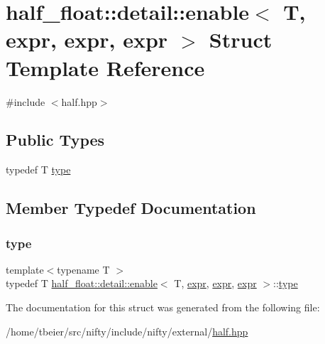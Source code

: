 \hypertarget{structhalf__float_1_1detail_1_1enable_3_01T_00_01expr_00_01expr_00_01expr_01_4}{}\section{half\+\_\+float\+:\+:detail\+:\+:enable$<$ T, expr, expr, expr $>$ Struct Template Reference}
\label{structhalf__float_1_1detail_1_1enable_3_01T_00_01expr_00_01expr_00_01expr_01_4}


{\ttfamily \#include $<$half.\+hpp$>$}

\subsection*{Public Types}
\begin{DoxyCompactItemize}
\item 
typedef T \hyperlink{structhalf__float_1_1detail_1_1enable_3_01T_00_01expr_00_01expr_00_01expr_01_4_a1dee5125aa0c5cfbd25e725ed2530905}{type}
\end{DoxyCompactItemize}


\subsection{Member Typedef Documentation}
\mbox{\label{structhalf__float_1_1detail_1_1enable_3_01T_00_01expr_00_01expr_00_01expr_01_4_a1dee5125aa0c5cfbd25e725ed2530905}} 
\subsubsection{\texorpdfstring{type}{type}}
{\footnotesize\ttfamily template$<$typename T $>$ \\
typedef T \hyperlink{structhalf__float_1_1detail_1_1enable}{half\+\_\+float\+::detail\+::enable}$<$ T, \hyperlink{structhalf__float_1_1detail_1_1expr}{expr}, \hyperlink{structhalf__float_1_1detail_1_1expr}{expr}, \hyperlink{structhalf__float_1_1detail_1_1expr}{expr} $>$\+::\hyperlink{structhalf__float_1_1detail_1_1enable_3_01T_00_01expr_00_01expr_00_01expr_01_4_a1dee5125aa0c5cfbd25e725ed2530905}{type}}



The documentation for this struct was generated from the following file\+:\begin{DoxyCompactItemize}
\item 
/home/tbeier/src/nifty/include/nifty/external/\hyperlink{half_8hpp}{half.\+hpp}\end{DoxyCompactItemize}
